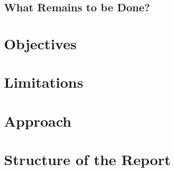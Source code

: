 \subsection*{What Remains to be Done?}
\section{Objectives}



\section{Limitations}
\section{Approach}

\section{Structure of the Report}

\begin{remark}
\end{remark}